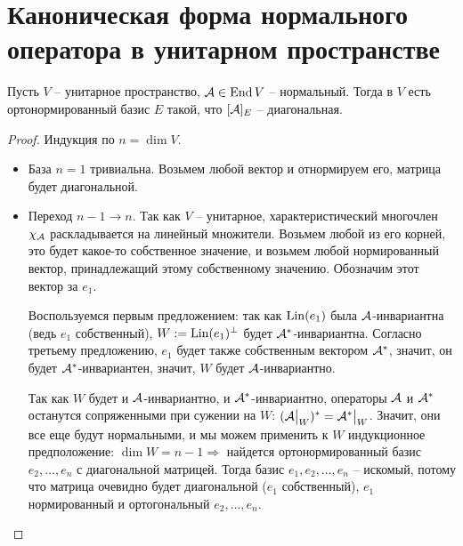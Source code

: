 \section{Каноническая форма нормального оператора в унитарном пространстве}
\begin{theorem}
    Пусть $V$ -- унитарное пространство, $\mathcal{A} \in \operatorname{End} V$ -- нормальный. 
    Тогда в $V$ есть ортонормированный базис $E$ такой, что $[\mathcal{A}]_E$ -- диагональная.
\end{theorem}
\begin{proof}
    Индукция по $n = \dim V$.
    \begin{itemize}
        \item База $n = 1$ тривиальна. Возьмем любой вектор и отнормируем его, матрица будет диагональной.
        \item Переход $n - 1 \to n$. 
        Так как $V$ -- унитарное, характеристический многочлен $\chi_{\mathcal{A}}$ раскладывается на линейный множители. 
        Возьмем любой из его корней, это будет какое-то собственное значение, и возьмем любой нормированный вектор, принадлежащий этому собственному значению. 
        Обозначим этот вектор за $e_1$. 

        Воспользуемся первым предложением: так как $\operatorname{Lin}(e_1)$ была $\mathcal{A}$-инвариантна (ведь $e_1$ собственный), $W := \operatorname{Lin}(e_1)^\perp$ будет $\mathcal{A}^*$-инвариантна.
        Согласно третьему предложению, $e_1$ будет также собственным вектором $\mathcal{A}^*$, значит, он будет $\mathcal{A}^*$-инвариантен, значит, $W$ будет $\mathcal{A}$-инвариантно.

        Так как $W$ будет и $\mathcal{A}$-инвариантно, и $\mathcal{A}^*$-инвариантно, операторы $\mathcal{A}$ и $\mathcal{A}^*$ останутся сопряженными при сужении на $W$: $(\mathcal{A}\big|_W)^* = \mathcal{A}^*\big|_W$. 
        Значит, они все еще будут нормальными, и мы можем применить к $W$ индукционное предположение: $\dim W = n - 1 \Rightarrow$ найдется ортонормированный базис $e_2, \dots, e_n$ с диагональной матрицей.
        Тогда базис $e_1, e_2, \dots, e_n$ -- искомый, потому что матрица очевидно будет диагональной ($e_1$ собственный), $e_1$ нормированный и ортогональный $e_2, \dots, e_n$.
    \end{itemize}
\end{proof}
